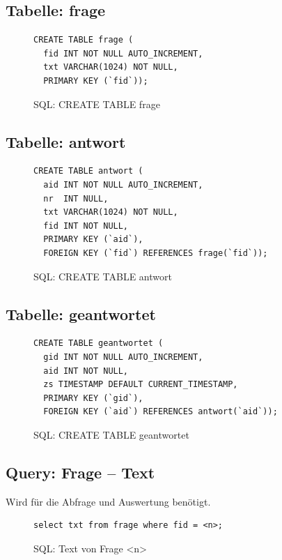 \subsection{Tabelle: frage}
\begin{figure}[h]
\begin{verbatim}
CREATE TABLE frage (
  fid INT NOT NULL AUTO_INCREMENT,
  txt VARCHAR(1024) NOT NULL,
  PRIMARY KEY (`fid`));
\end{verbatim}
\caption{SQL: CREATE TABLE frage}
\label{sql:tblfrage}
\end{figure}

\subsection{Tabelle: antwort}
\begin{figure}[h]
\begin{verbatim}
CREATE TABLE antwort (
  aid INT NOT NULL AUTO_INCREMENT,
  nr  INT NULL,
  txt VARCHAR(1024) NOT NULL,
  fid INT NOT NULL,
  PRIMARY KEY (`aid`),
  FOREIGN KEY (`fid`) REFERENCES frage(`fid`));
\end{verbatim}
\caption{SQL: CREATE TABLE antwort}
\label{sql:tblantwort}
\end{figure}

\subsection{Tabelle: geantwortet}
\begin{figure}[h]
\begin{verbatim}
CREATE TABLE geantwortet (
  gid INT NOT NULL AUTO_INCREMENT,
  aid INT NOT NULL,
  zs TIMESTAMP DEFAULT CURRENT_TIMESTAMP,
  PRIMARY KEY (`gid`),
  FOREIGN KEY (`aid`) REFERENCES antwort(`aid`));
\end{verbatim}
\caption{SQL: CREATE TABLE geantwortet}
\label{sql:tblgeantwortet}
\end{figure}

\subsection{Query: Frage -- Text}
Wird für die Abfrage und Auswertung benötigt.

\begin{figure}[h]
\begin{verbatim}
select txt from frage where fid = <n>;
\end{verbatim}
\caption{SQL: Text von Frage <n>}
\label{sql:qfragetxt}
\end{figure}

